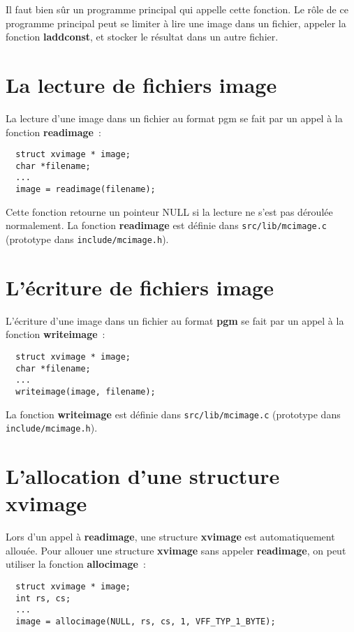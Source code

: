 Il faut bien s\^ur un programme principal qui appelle cette fonction.
Le r\^ole de ce programme principal peut se limiter \`a lire
une image dans un fichier, appeler la fonction {\bf laddconst}, et 
stocker le r\'esultat dans un autre fichier.

\section{La lecture de fichiers image}

La lecture d'une image dans un fichier au format pgm se fait 
par un appel \`a la fonction {\bf readimage}~:

\begin{verbatim}
  struct xvimage * image;
  char *filename;
  ...
  image = readimage(filename);  
\end{verbatim}

Cette fonction retourne un pointeur NULL si la lecture ne s'est
pas d\'eroul\'ee normalement. La fonction {\bf readimage} est d\'efinie
dans \verb|src/lib/mcimage.c| (prototype dans \verb|include/mcimage.h|).

\section{L'\'ecriture de fichiers image}

L'\'ecriture d'une image dans un fichier au format {\bf pgm} se fait 
par un appel \`a la fonction {\bf writeimage}~:

\begin{verbatim}
  struct xvimage * image;
  char *filename;
  ...
  writeimage(image, filename);
\end{verbatim}

La fonction {\bf writeimage} est d\'efinie
dans \verb|src/lib/mcimage.c| (prototype dans \verb|include/mcimage.h|).

\section{L'allocation d'une structure {\bf xvimage}}

Lors d'un appel \`a {\bf readimage}, une structure {\bf xvimage} est 
automatiquement allou\'ee. Pour allouer une structure
{\bf xvimage} sans appeler {\bf readimage}, on peut utiliser la fonction
{\bf allocimage}~:

\begin{verbatim}
  struct xvimage * image;
  int rs, cs;
  ...  
  image = allocimage(NULL, rs, cs, 1, VFF_TYP_1_BYTE);
\end{verbatim}

